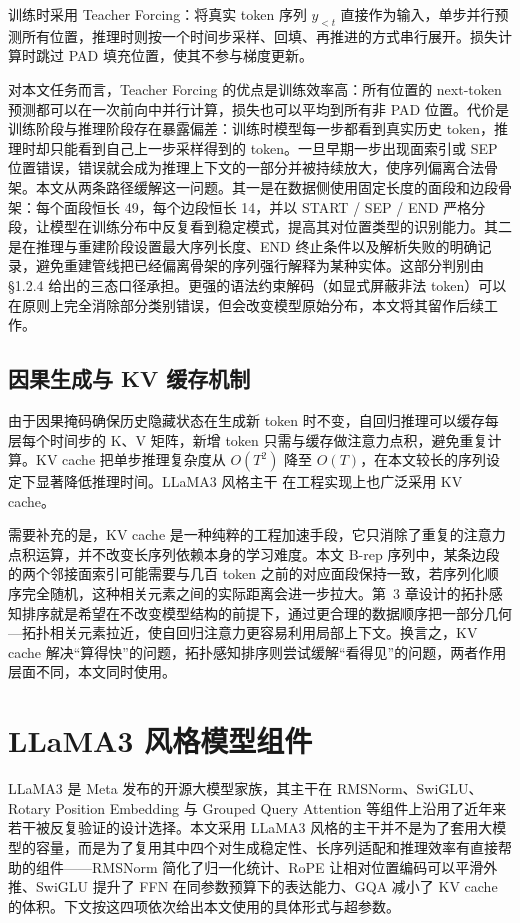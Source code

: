 训练时采用 Teacher Forcing：将真实 token 序列 $y_{<t}$ 直接作为输入，单步并行预测所有位置，推理时则按一个时间步采样、回填、再推进的方式串行展开。损失计算时跳过 PAD 填充位置，使其不参与梯度更新。

对本文任务而言，Teacher Forcing 的优点是训练效率高：所有位置的 next-token 预测都可以在一次前向中并行计算，损失也可以平均到所有非 PAD 位置。代价是训练阶段与推理阶段存在暴露偏差：训练时模型每一步都看到真实历史 token，推理时却只能看到自己上一步采样得到的 token。一旦早期一步出现面索引或 SEP 位置错误，错误就会成为推理上下文的一部分并被持续放大，使序列偏离合法骨架。本文从两条路径缓解这一问题。其一是在数据侧使用固定长度的面段和边段骨架：每个面段恒长 49，每个边段恒长 14，并以 START / SEP / END 严格分段，让模型在训练分布中反复看到稳定模式，提高其对位置类型的识别能力。其二是在推理与重建阶段设置最大序列长度、END 终止条件以及解析失败的明确记录，避免重建管线把已经偏离骨架的序列强行解释为某种实体。这部分判别由 §1.2.4 给出的三态口径承担。更强的语法约束解码（如显式屏蔽非法 token）可以在原则上完全消除部分类别错误，但会改变模型原始分布，本文将其留作后续工作。

\subsection{因果生成与 KV 缓存机制}

由于因果掩码确保历史隐藏状态在生成新 token 时不变，自回归推理可以缓存每层每个时间步的 K、V 矩阵，新增 token 只需与缓存做注意力点积，避免重复计算。KV cache 把单步推理复杂度从 $O(T^2)$ 降至 $O(T)$，在本文较长的序列设定下显著降低推理时间。LLaMA3 风格主干\cite{meta_2024_llama3} 在工程实现上也广泛采用 KV cache。

需要补充的是，KV cache 是一种纯粹的工程加速手段，它只消除了重复的注意力点积运算，并不改变长序列依赖本身的学习难度。本文 B-rep 序列中，某条边段的两个邻接面索引可能需要与几百 token 之前的对应面段保持一致，若序列化顺序完全随机，这种相关元素之间的实际距离会进一步拉大。第~3 章设计的拓扑感知排序就是希望在不改变模型结构的前提下，通过更合理的数据顺序把一部分几何—拓扑相关元素拉近，使自回归注意力更容易利用局部上下文。换言之，KV cache 解决“算得快”的问题，拓扑感知排序则尝试缓解“看得见”的问题，两者作用层面不同，本文同时使用。

\section{LLaMA3 风格模型组件}

LLaMA3\cite{meta_2024_llama3} 是 Meta 发布的开源大模型家族，其主干在 RMSNorm、SwiGLU、Rotary Position Embedding 与 Grouped Query Attention 等组件上沿用了近年来若干被反复验证的设计选择\cite{zhang_2019_rmsnorm,shazeer_2020_glu,su_2024_roformer,ainslie_2023_gqa}。本文采用 LLaMA3 风格的主干并不是为了套用大模型的容量，而是为了复用其中四个对生成稳定性、长序列适配和推理效率有直接帮助的组件——RMSNorm 简化了归一化统计、RoPE 让相对位置编码可以平滑外推、SwiGLU 提升了 FFN 在同参数预算下的表达能力、GQA 减小了 KV cache 的体积。下文按这四项依次给出本文使用的具体形式与超参数。

